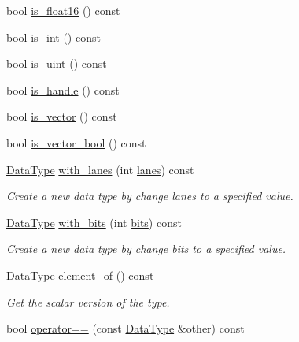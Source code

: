 \begin{DoxyCompactItemize}
\item 
bool \hyperlink{classtvm_1_1runtime_1_1DataType_ad2152f38ce867397b99bcbe3fba0618b}{is\+\_\+float16} () const 
\item 
bool \hyperlink{classtvm_1_1runtime_1_1DataType_aa0f1df1d5f4ed20bea6260b8ae939e20}{is\+\_\+int} () const 
\item 
bool \hyperlink{classtvm_1_1runtime_1_1DataType_a731b95a55b3dae496b9ecccffe834772}{is\+\_\+uint} () const 
\item 
bool \hyperlink{classtvm_1_1runtime_1_1DataType_af0ddd5dcfdee76fe344f4bfb7aff806d}{is\+\_\+handle} () const 
\item 
bool \hyperlink{classtvm_1_1runtime_1_1DataType_a21d377fb6acaf48f03d94cee082e08e9}{is\+\_\+vector} () const 
\item 
bool \hyperlink{classtvm_1_1runtime_1_1DataType_a0990e6ef4d29b009f17702fecc4a0094}{is\+\_\+vector\+\_\+bool} () const 
\item 
\hyperlink{classtvm_1_1runtime_1_1DataType}{Data\+Type} \hyperlink{classtvm_1_1runtime_1_1DataType_ab188f54da1a54b34a11621fcb8feb6a7}{with\+\_\+lanes} (int \hyperlink{classtvm_1_1runtime_1_1DataType_abc92c7ca9966808f024983c76e12cf4a}{lanes}) const 
\begin{DoxyCompactList}\small\item\em Create a new data type by change lanes to a specified value. \end{DoxyCompactList}\item 
\hyperlink{classtvm_1_1runtime_1_1DataType}{Data\+Type} \hyperlink{classtvm_1_1runtime_1_1DataType_a9cf48e54cda66f3351b331fcc6cca1dc}{with\+\_\+bits} (int \hyperlink{classtvm_1_1runtime_1_1DataType_ac26a4b0d3de99a8c08ecc2618a8659d9}{bits}) const 
\begin{DoxyCompactList}\small\item\em Create a new data type by change bits to a specified value. \end{DoxyCompactList}\item 
\hyperlink{classtvm_1_1runtime_1_1DataType}{Data\+Type} \hyperlink{classtvm_1_1runtime_1_1DataType_a022ff4c55c831167018e94213cac8564}{element\+\_\+of} () const 
\begin{DoxyCompactList}\small\item\em Get the scalar version of the type. \end{DoxyCompactList}\item 
bool \hyperlink{classtvm_1_1runtime_1_1DataType_a50fe4658199e24d8287934220e1cc8ab}{operator==} (const \hyperlink{classtvm_1_1runtime_1_1DataType}{Data\+Type} \&other) const 

\end{DoxyCompactItemize}
